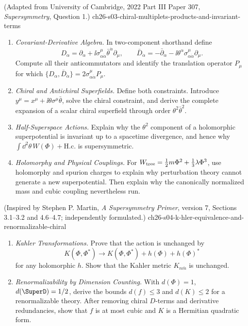 \begin{enumerate}
    {(Adapted from University of Cambridge, 2022 Part III Paper 307, \emph{Supersymmetry}, Question 1.)}
    {ch26-s03-chiral-multiplets-products-and-invariant-terms}
  \begin{enumerate}
    \item \emph{Covariant-Derivative Algebra.}
    In two-component shorthand define
      \[
        D_\alpha=\partial_\alpha
          +\ii\sigma^\mu_{\alpha\dot\alpha}\bar\theta^{\dot\alpha}\partial_\mu,
        \qquad
        \bar D_{\dot\alpha}=-\bar\partial_{\dot\alpha}
          -\ii\theta^\alpha\sigma^\mu_{\alpha\dot\alpha}\partial_\mu .
      \]
      Compute all their anticommutators and identify the translation operator
      \(P_\mu\) for which
      \(\{D_\alpha,\bar D_{\dot\alpha}\}
        =2\sigma^\mu_{\alpha\dot\alpha}P_\mu\).
    \item \emph{Chiral and Antichiral Superfields.}
    Define both constraints.  Introduce
      \(y^\mu=x^\mu+\ii\theta\sigma^\mu\bar\theta\), solve the chiral
      constraint, and derive the complete expansion of a scalar chiral
      superfield through order \(\theta^2\bar\theta^2\).
    \item \emph{Half-Superspace Actions.}
    Explain why the \(\theta^2\) component of a holomorphic
      superpotential is invariant up to a spacetime divergence, and hence why
      \(\int \dd^2\theta\,W(\Phi)+\mathrm{H.c.}\) is supersymmetric.
    \item \emph{Holomorphy and Physical Couplings.}
    For
      \(W_{\rm tree}=\tfrac12m\Phi^2+\tfrac13\lambda\Phi^3\), use
      holomorphy and spurion charges to explain why perturbation theory cannot
      generate a new superpotential.  Then explain why the canonically
      normalized mass and cubic coupling nevertheless run.
  \end{enumerate}

    {(Inspired by Stephen P. Martin, \emph{A Supersymmetry Primer}, version 7, Sections 3.1--3.2 and 4.6--4.7; independently formulated.)}
    {ch26-s04-k-hler-equivalence-and-renormalizable-chiral}
  \begin{enumerate}
    \item \emph{Kahler Transformations.}
    Prove that the action is unchanged by
      \[
        K(\Phi,\Phi^*)\longrightarrow K(\Phi,\Phi^*)+
          h(\Phi)+h(\Phi)^*
      \]
      for any holomorphic \(h\).  Show that the Kahler metric
      \(K_{n\bar m}\) is unchanged.
    \item \emph{Renormalizability by Dimension Counting.}
    With \(d(\Phi)=1\), \(d(\SuperD)=1/2\), derive the bounds
      \(d(f)\le3\) and \(d(K)\le2\) for a renormalizable theory.  After removing
      chiral \(D\)-terms and derivative redundancies, show that \(f\) is at
      most cubic and \(K\) is a Hermitian quadratic form.
  \end{enumerate}


\end{enumerate}
